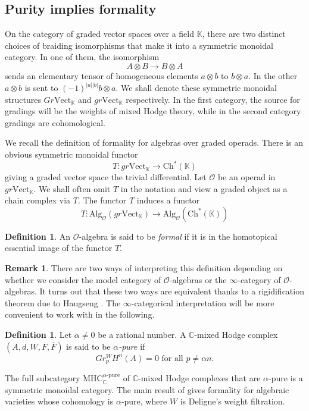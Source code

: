 \documentclass[a4paper]{amsart}
\theoremstyle{definition}
\newtheorem{defi}[theo]{Definition}
\newtheorem{rema}[theo]{Remark}
\theoremstyle{theorem}
\newcommand{\CC}{\mathbb{C}}
\newcommand{\KK}{\mathbb{K}}
\newcommand{\Oo}{\mathcal{O}}
\newcommand{\ov}{\overline}
\newcommand{\ch}[1]{\mathrm{Ch^*({#1})}}
\newcommand{\MHC}{{\mathrm{MHC}}}
\newcommand{\Vect}{\mathrm{Vect}}
\newcommand{\Alg}{\mathrm{Alg}}
\begin{document}
\subsection{Purity implies formality}

On the category of graded vector spaces over a field $\KK$, there are two distinct choices of braiding isomorphisms that make it into a symmetric monoidal category. In one of them, the isomorphism
\[A\otimes B\to B\otimes A\]
sends an elementary tensor of homogeneous elements $a\otimes b$ to $b\otimes a$. In the other $a\otimes b$ is sent to $(-1)^{|a||b|}b\otimes a$. We shall denote these symmetric monoidal structures $Gr\Vect_\KK$ and $gr\Vect_\KK$ respectively.
In the first category, the source for gradings will be the weights of mixed Hodge theory, while in the second category gradings are cohomological.


We recall the definition of formality for algebras over graded operads. There is an obvious symmetric monoidal functor
\[T:gr\Vect_\KK\to \ch{\KK}\]
giving a graded vector space the trivial differential. Let $\Oo$ be an operad in $gr\Vect_{\KK}$. We shall often omit $T$ in the notation and view a graded object as a chain complex via $T$. The functor $T$ induces a functor
\[T:\Alg_{\Oo}(gr\Vect_\KK)\to\Alg_{\Oo}(\ch{\KK})\]

\begin{defi}
An $\Oo$-algebra is said to be \textit{formal} if it is in the homotopical  essential image of the functor $T$.
\end{defi}

\begin{rema}
There are two ways of interpreting this definition depending on whether we consider the model category of $\Oo$-algebras or the $\infty$-category of $\Oo$-algebras. It turns out that these two ways are equivalent thanks to a rigidification theorem due to Haugseng \cite[Theorem 4.10]{haugsengalgebras}. The $\infty$-categorical interpretation will be more convenient to work with in the following.
\end{rema}









\begin{defi}Let $\alpha\neq 0$ be a rational number.
A $\CC$-mixed Hodge complex $(A,d,W,F,\ov{F})$ is said to be \textit{$\alpha$-pure} if
\[Gr_{p}^W H^n(A)=0\text{ for all }p\neq \alpha n.\]
\end{defi}
The full subcategory $\MHC_\CC^{\alpha\text{-pure}}$ of $\CC$-mixed Hodge complexes that are $\alpha$-pure is a symmetric monoidal category.
The main result of \cite{CiHo} gives formality for algebraic varieties whose cohomology is $\alpha$-pure, where $W$ is Deligne's weight filtration. 
\end{document}

